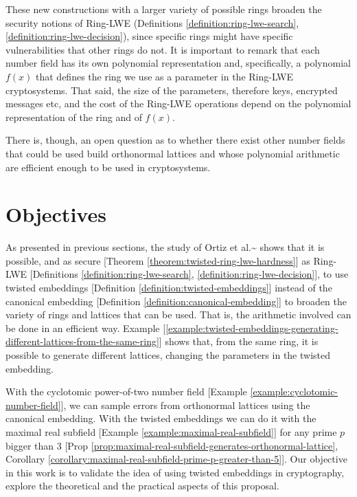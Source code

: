 \documentclass[a4paper,12pt]{article}
\begin{document}
These new constructions with a larger variety of possible rings broaden the security notions of Ring-LWE (Definitions \ref{definition:ring-lwe-search}, \ref{definition:ring-lwe-decision}), since specific rings might have specific vulnerabilities that other rings do not. It is important to remark that each number field has its own polynomial representation and, specifically, a polynomial \(f(x)\) that defines the ring we use as a parameter in the Ring-LWE cryptosystems. That said, the size of the parameters, therefore keys, encrypted messages etc, and the cost of the Ring-LWE operations depend on the polynomial representation of the ring and of \(f(x)\).

There is, though, an open question as to whether there exist other number fields that could be used build orthonormal lattices and whose polynomial arithmetic are efficient enough to be used in cryptosystems. 
\section{Objectives}
\label{objectives}
As presented in previous sections, the study of Ortiz et al.\textasciitilde{}\cite{Ortiz2021}  shows that it is possible, and as secure [Theorem \ref{theorem:twisted-ring-lwe-hardness}] as Ring-LWE [Definitions \ref{definition:ring-lwe-search}, \ref{definition:ring-lwe-decision}], to use twisted embeddings [Definition \ref{definition:twisted-embeddings}] instead of the canonical embedding [Definition \ref{definition:canonical-embedding}] to broaden the variety of rings and lattices that can be used. That is, the arithmetic involved can be done in an efficient way. Example [\ref{example:twisted-embeddings-generating-different-lattices-from-the-same-ring}] shows that, from the same ring, it is possible to generate different lattices, changing the parameters in the twisted embedding.

With the cyclotomic power-of-two number field [Example \ref{example:cyclotomic-number-field}], we can sample errors from orthonormal lattices using the canonical embedding. With the twisted embeddings we can do it with the maximal real subfield [Example \ref{example:maximal-real-subfield}] for any prime \(p\) bigger than \(3\) [Prop \ref{prop:maximal-real-subfield-generates-orthonormal-lattice}, Corollary \ref{corollary:maximal-real-subfield-prime-p-greater-than-5}]. Our objective in  this work is to validate the idea of using twisted embeddings in cryptography, explore the theoretical and the practical aspects of this proposal.
\end{document}
